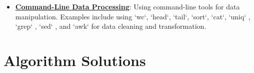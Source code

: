 \documentclass{article}%
\begin{document}
\begin{itemize}[leftmargin=*]
\item \href{https://purdue.brightspace.com/d2l/common/assets/pdfjs-d2l-dist/1.0.14-legacy/web/viewer.html?file=\%2Fcontent\%2Fenforced\%2F1095465-WL.202510.CS24200.LE1\%2F06L3-wrangling.pdf\%3Fou\%3D1095465\&lang=en-us\&container=d2l-fileviewer-rendered-pdf\&fullscreen=d2l-fileviewer-rendered-pdf-dialog\&height=667#page=81}{\textbf{Command-Line Data Processing}}: Using command-line tools for data manipulation. Examples include using `wc`, `head`, `tail`, `sort`, `cat`, `uniq` , `grep` , `sed` , and `awk`  for data cleaning and transformation.%
\end{itemize}

%
\section{Algorithm Solutions}%
\label{sec:AlgorithmSolutions}%
\end{document}
